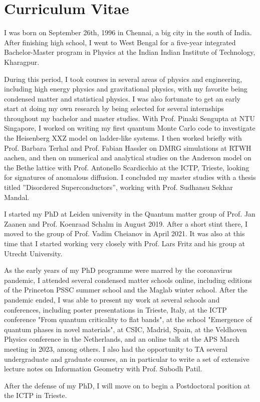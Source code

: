 \newpage
\thispagestyle{empty}

\chapter*{Curriculum Vitae} %
\label{Curriculum Vitae}

I was born on September 26th, 1996 in Chennai, a big city in the south of India. After finishing high school, I went to West Bengal for a five-year integrated Bachelor-Master program in Physics at the Indian Indian Institute of Technology, Kharagpur.
\par
During this period, I took courses in several areas of physics and engineering, including high energy physics and gravitational physics, with my favorite being condensed matter and statistical physics. I was also fortunate to get an early start at doing my own research by being selected for several internships throughout my bachelor and master studies. With Prof. Pinaki Sengupta at NTU Singapore, I worked on writing my first quantum Monte Carlo code to investigate the Heisenberg XXZ model on ladder-like systems. I then worked briefly with Prof. Barbara Terhal and Prof. Fabian Hassler on DMRG simulations at RTWH aachen, and then on numerical and analytical studies on the Anderson model on the Bethe lattice with Prof. Antonello Scardicchio at the ICTP, Trieste, looking for signatures of anomalous diffusion. I concluded my master studies with a thesis titled ''Disordered Superconductors'', working with Prof. Sudhansu Sekhar Mandal. 
\par
I started my PhD at Leiden university in the Quantum matter group of Prof. Jan Zaanen and Prof. Koenraad Schalm in August 2019. After a short stint there, I moved to the group of Prof. Vadim Cheianov in April 2021. It was also at this time that I started working very closely with Prof. Lars Fritz and his group at Utrecht University. 
\par
As the early years of my PhD programme were marred by the coronavirus pandemic, I attended several condensed matter schools online, including editions of the Princeton PSSC summer school and the Maglab winter school. After the pandemic ended, I was able to present my work at several schools and conferences, including poster presentations in Trieste, Italy, at the ICTP conference "From quantum criticality to flat bands", at the school "Emergence of quantum phases in novel materials", at CSIC, Madrid, Spain, at the Veldhoven Physics conference in the Netherlands, and an online talk at the APS March meeting in 2023, among others. I also had the opportunity to TA several undergraduate and graduate courses, an in particular to write a set of extensive lecture notes on Information Geometry with Prof. Subodh Patil. 
\par
After the defense of my PhD, I will move on to begin a Postdoctoral position at the ICTP in Trieste. 

\newpage
\thispagestyle{empty}